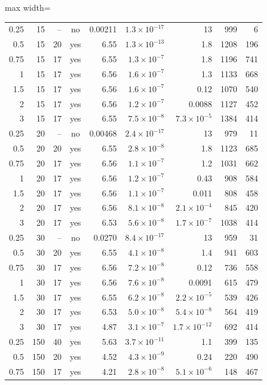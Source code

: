 \documentclass[11pt,letterpaper,fleqn]{article}
\begin{document}
\begin{table}[p]
\begin{adjustbox}{max width=\textwidth}
\begin{tabular}{@{}rrrcrrrrr@{}}
0.25 & 15 & -- & no & 0.00211 & $1.3\times10^{-17}$ & 13 & 999 & 6\\
0.5 & 15 & 20 & yes & 6.55 & $1.3\times10^{-13}$ & 1.8 & 1208 & 196\\
0.75 & 15 & 17 & yes & 6.55 & $1.3\times10^{-7}$ & 1.8 & 1196 & 741\\
1 & 15 & 17 & yes & 6.56 & $1.6\times10^{-7}$ & 1.3 & 1133 & 668\\
1.5 & 15 & 17 & yes & 6.56 & $1.6\times10^{-7}$ & 0.12 & 1070 & 540\\
2 & 15 & 17 & yes & 6.56 & $1.2\times10^{-7}$ & 0.0088 & 1127 & 452\\
3 & 15 & 17 & yes & 6.55 & $7.5\times10^{-8}$ & $7.3\times10^{-5}$ & 1384 & 414\\
0.25 & 20 & -- & no & 0.00468 & $2.4\times10^{-17}$ & 13 & 979 & 11\\
0.5 & 20 & 20 & yes & 6.55 & $2.8\times10^{-8}$ & 1.8 & 1123 & 685\\
0.75 & 20 & 17 & yes & 6.56 & $1.1\times10^{-7}$ & 1.2 & 1031 & 662\\
1 & 20 & 17 & yes & 6.56 & $1.2\times10^{-7}$ & 0.43 & 908 & 584\\
1.5 & 20 & 17 & yes & 6.56 & $1.1\times10^{-7}$ & 0.011 & 808 & 458\\
2 & 20 & 17 & yes & 6.56 & $8.1\times10^{-8}$ & $2.1\times10^{-4}$ & 845 & 420\\
3 & 20 & 17 & yes & 6.53 & $5.6\times10^{-8}$ & $1.7\times10^{-7}$ & 1038 & 414\\
0.25 & 30 & -- & no & 0.0270 & $8.4\times10^{-17}$ & 13 & 959 & 31\\
0.5 & 30 & 20 & yes & 6.55 & $4.1\times10^{-8}$ & 1.4 & 941 & 603\\
0.75 & 30 & 17 & yes & 6.56 & $7.2\times10^{-8}$ & 0.12 & 736 & 558\\
1 & 30 & 17 & yes & 6.56 & $7.6\times10^{-8}$ & 0.0091 & 615 & 479\\
1.5 & 30 & 17 & yes & 6.55 & $6.2\times10^{-8}$ & $2.2\times10^{-5}$ & 539 & 426\\
2 & 30 & 17 & yes & 6.53 & $5.0\times10^{-8}$ & $5.4\times10^{-8}$ & 564 & 419\\
3 & 30 & 17 & yes & 4.87 & $3.1\times10^{-7}$ & $1.7\times10^{-12}$ & 692 & 414\\
0.25 & 150 & 40 & yes & 5.63 & $3.7\times10^{-11}$ & 1.1 & 399 & 135\\
0.5 & 150 & 20 & yes & 4.52 & $4.3\times10^{-9}$ & 0.24 & 220 & 490\\
0.75 & 150 & 17 & yes & 4.21 & $2.8\times10^{-8}$ & $5.1\times10^{-6}$ & 148 & 467\\

\end{tabular}
\end{adjustbox}
\end{table}
\end{document}
